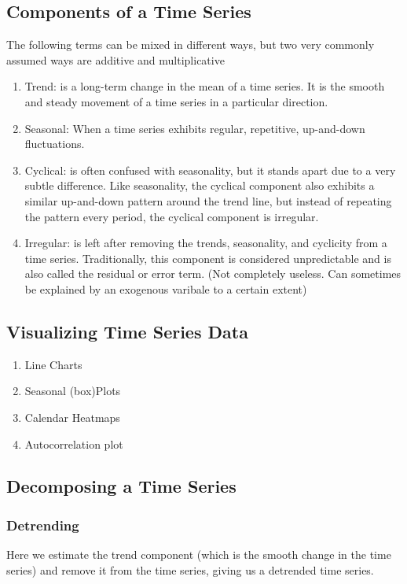 \documentclass{article}
\begin{document}
\subsection{Components of a Time Series}
The following terms can be mixed in different ways, but two very commonly assumed ways are additive and multiplicative
\begin{enumerate}
    \item Trend: is a long-term change in the mean of a time series. It is the smooth and steady movement of
    a time series in a particular direction.
    \item Seasonal: When a time series exhibits regular, repetitive, up-and-down fluctuations.
    \item Cyclical: is often confused with seasonality, but it stands apart due to a very subtle
    difference. Like seasonality, the cyclical component also exhibits a similar up-and-down pattern around
    the trend line, but instead of repeating the pattern every period, the cyclical component is irregular.
    \item Irregular: is left after removing the trends, seasonality, and cyclicity from a time series.
    Traditionally, this component is considered unpredictable and is also called the residual or error term. (Not completely useless. Can sometimes be explained by an exogenous varibale to a certain extent)
\end{enumerate}

\subsection{Visualizing Time Series Data}
\begin{enumerate}
    \item Line Charts 
    \item Seasonal (box)Plots 
    \item Calendar Heatmaps
    \item Autocorrelation plot
\end{enumerate}

\subsection{Decomposing a Time Series}
\subsubsection{Detrending}
Here we estimate the trend component (which is the smooth change in the time
series) and remove it from the time series, giving us a detrended time series.
\end{document}
